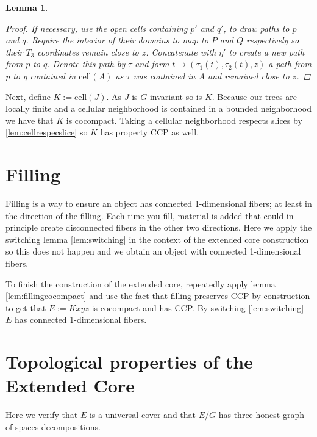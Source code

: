 \documentclass[12pt,parskip=full]{report}
\theoremstyle{plain}
\newtheorem{lem}[thm]{Lemma}
\theoremstyle{definition}
\begin{document}
\begin{lem}
\begin{proof}
If necessary, use the open cells containing \(p'\) and \(q'\), to draw paths  to \(p\) and \(q\). Require the interior of their domains to map to \(P\) and \(Q\) respectively so their \(T_3\) coordinates remain close to \(z\). Concatenate with \(\eta'\) to create a new path from \(p\) to \(q\). Denote this path by \(\tau\) and form \(t\to (\tau_1(t), \tau_2(t), z)\) a path from p to q contained in \(\text{cell}(A)\) as \(\tau\) was contained in \(A\) and remained close to \(z\).
    
    \end{proof}
    
    
\end{lem}

        
        
        Next, define \(K := \text{cell}(J)\). As \(J\) is \(G\) invariant so is \(K\).  Because our trees are locally finite and a cellular neighborhood is contained in a bounded neighborhood we have that \(K\) is cocompact. Taking a cellular neighborhood respects slices by \ref{lem:cellrespecslice}  so \(K\) has property CCP as well.

\section{Filling}

Filling is a way to ensure an object has connected 1-dimensional fibers; at least in the direction of the filling. Each time you fill, material is added that could in principle create disconnected fibers in the other two  directions. Here we apply the switching lemma \ref{lem:switching} in the context of the extended core construction so this does not happen and we obtain an object with connected 1-dimensional fibers. 



To finish the construction of the extended core, repeatedly apply lemma \ref{lem:fillingcocompact} and use the fact that filling preserves CCP  by construction to get that \(E:= Kxyz\) is cocompact and has CCP. By switching \ref{lem:switching} \(E\) has connected 1-dimensional fibers. 

\section{Topological properties of the Extended Core}

Here we verify that \(E\) is a universal cover and that \(E/G\) has three honest graph of spaces decompositions.
\end{document}

